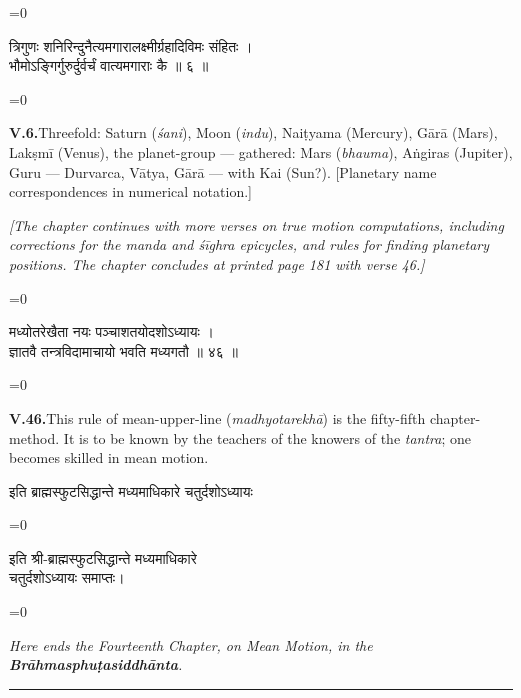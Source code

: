 \documentclass[11pt,a4paper]{article}
\newcommand{\longline}{\noindent\rule{\textwidth}{0.4pt}}
\newcommand{\cnote}[1]{\textcolor{notecolor}{\textit{#1}}}
\newcommand{\dev}[1]{{\devanagarifont\color{sktcolor}#1}}
\newcommand{\iast}[1]{\textit{#1}}
\newenvironment{paracol}[1]{\begingroup}{\endgroup}
\newcommand{\switchcolumn}[1][]{%
  \ifnum#1=0\relax\else\par\nobreak\vspace{0.5em}\par\nobreak\fi%
}
\begin{document}
\vspace{0.3cm}

\begin{paracol}{2}
\switchcolumn[0]
\dev{%
त्रिगुणः शनिरिन्दुनैत्यमगारालक्ष्मीर्ग्रहादिविमः संहितः ।\\
भौमोऽङ्गिर्गुरुर्दुर्वर्चं वात्यमगाराः कै ॥ ६ ॥
}

\switchcolumn[1]
\textbf{V.6.}\quad Threefold: Saturn (\iast{śani}), Moon
(\iast{indu}), Naiṭyama (Mercury), Gārā (Mars), Lakṣmī (Venus),
the planet-group — gathered: Mars (\iast{bhauma}), Aṅgiras (Jupiter),
Guru — Durvarca, Vātya, Gārā — with Kai (Sun?). [Planetary name
correspondences in numerical notation.]
\end{paracol}

\vspace{0.5cm}
\cnote{[The chapter continues with more verses on true motion
computations, including corrections for the \iast{manda} and \iast{śīghra}
epicycles, and rules for finding planetary positions. The chapter
concludes at printed page 181 with verse 46.]}
\vspace{0.5cm}

\begin{paracol}{2}
\switchcolumn[0]
\dev{%
मध्योतरेखैता नयः पञ्चाशतयोदशोऽध्यायः ।\\
ज्ञातवै तन्त्रविदामाचायो भवति मध्यगतौ ॥ ४६ ॥
}

\switchcolumn[1]
\textbf{V.46.}\quad This rule of mean-upper-line (\iast{madhyotarekhā})
is the fifty-fifth chapter-method. It is to be known by the teachers
of the knowers of the \iast{tantra}; one becomes skilled in mean
motion.
\end{paracol}

\vspace{0.3cm}

\begin{center}
\dev{इति ब्राह्मस्फुटसिद्धान्ते मध्यमाधिकारे चतुर्दशोऽध्यायः}
\end{center}

\vspace{0.3cm}
\begin{paracol}{2}
\switchcolumn[0]
\dev{%
इति श्री-ब्राह्मस्फुटसिद्धान्ते मध्यमाधिकारे\\
चतुर्दशोऽध्यायः समाप्तः।
}

\switchcolumn[1]
\textit{Here ends the Fourteenth Chapter, on Mean Motion, in the
\textbf{Brāhmasphuṭasiddhānta}.}
\end{paracol}

\longline
\newpage
\end{document}

